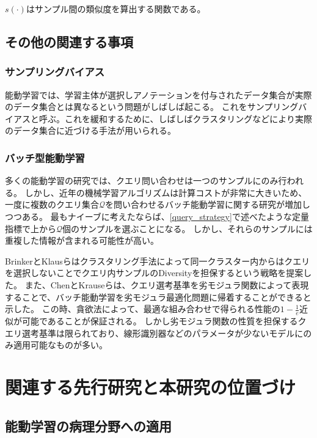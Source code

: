 $s(\cdot)$はサンプル間の類似度を算出する関数である。

\subsection{その他の関連する事項}
\subsubsection{サンプリングバイアス}
能動学習では、学習主体が選択しアノテーションを付与されたデータ集合が実際のデータ集合とは異なるという問題がしばしば起こる。
これをサンプリングバイアスと呼ぶ。これを緩和するために、しばしばクラスタリングなどにより実際のデータ集合に近づける手法が用いられる。

\subsubsection{バッチ型能動学習}
多くの能動学習の研究では、クエリ問い合わせは一つのサンプルにのみ行われる。
しかし、近年の機械学習アルゴリズムは計算コストが非常に大きいため、一度に複数のクエリ集合$\mathcal{Q}$を問い合わせるバッチ能動学習に関する研究が増加しつつある。
最もナイーブに考えたならば、\ref{query_strategy}で述べたような定量指標で上から$\mathcal{Q}$個のサンプルを選ぶことになる。
しかし、それらのサンプルには重複した情報が含まれる可能性が高い。

BrinkerとKlausらはクラスタリング手法によって同一クラスター内からはクエリを選択しないことでクエリ内サンプルのDiversityを担保するという戦略を提案した\cite{brinker2003incorporating}。
また、ChenとKrauseらは、クエリ選考基準を劣モジュラ関数によって表現することで、バッチ能動学習を劣モジュラ最適化問題に帰着することができると示した\cite{chen2013near}。
この時、貪欲法によって、最適な組み合わせで得られる性能の$1 - \frac{1}{e}$近似が可能であることが保証される。
しかし劣モジュラ関数の性質を担保するクエリ選考基準は限られており、線形識別器などのパラメータが少ないモデルにのみ適用可能なものが多い。

\section{関連する先行研究と本研究の位置づけ}

\subsection{能動学習の病理分野への適用}


